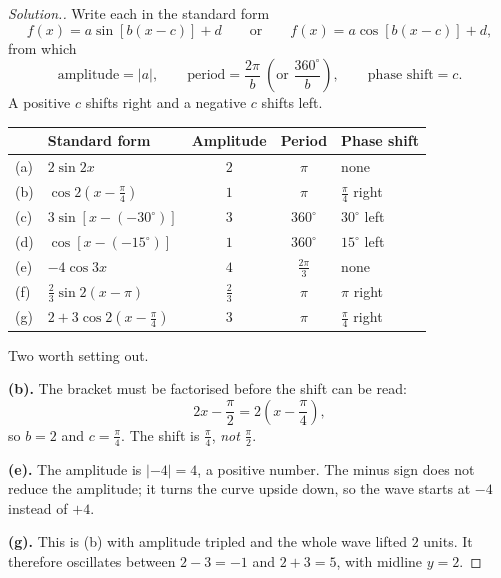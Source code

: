 \documentclass[11pt,a4paper]{article}
\theoremstyle{definition}
\newenvironment{solution}
  {\renewcommand{\qedsymbol}{}\begin{proof}[\textit{Solution}.]}
  {\end{proof}}
\begin{document}
\begin{solution}
Write each in the standard form
$$f(x)=a\sin\left[b(x-c)\right]+d\qquad\text{or}\qquad f(x)=a\cos\left[b(x-c)\right]+d,$$
from which
$$\text{amplitude}=|a|,\qquad \text{period}=\frac{2\pi}{b}
\ \left(\text{or } \frac{360^\circ}{b}\right),\qquad \text{phase shift}=c.$$
A positive $c$ shifts right and a negative $c$ shifts left.

\begin{table}[H]
\centering
\begin{tabular}{|l|l|c|c|l|}
\hline
 & Standard form & Amplitude & Period & Phase shift\\
\hline
(a) & $2\sin 2x$ & $2$ & $\pi$ & none\\
(b) & $\cos 2\left(x-\frac{\pi}{4}\right)$ & $1$ & $\pi$ & $\frac{\pi}{4}$ right\\
(c) & $3\sin\left[x-(-30^\circ)\right]$ & $3$ & $360^\circ$ & $30^\circ$ left\\
(d) & $\cos\left[x-(-15^\circ)\right]$ & $1$ & $360^\circ$ & $15^\circ$ left\\
(e) & $-4\cos 3x$ & $4$ & $\frac{2\pi}{3}$ & none\\
(f) & $\frac{2}{3}\sin 2(x-\pi)$ & $\frac{2}{3}$ & $\pi$ & $\pi$ right\\
(g) & $2+3\cos 2\left(x-\frac{\pi}{4}\right)$ & $3$ & $\pi$ & $\frac{\pi}{4}$ right\\
\hline
\end{tabular}
\end{table}

Two worth setting out.

\textbf{(b).} The bracket must be factorised before the shift can be read:
$$2x-\frac{\pi}{2}=2\left(x-\frac{\pi}{4}\right),$$
so $b=2$ and $c=\frac{\pi}{4}$. The shift is $\frac{\pi}{4}$, \emph{not} $\frac{\pi}{2}$.

\textbf{(e).} The amplitude is $|-4|=4$, a positive number. The minus sign does not
reduce the amplitude; it turns the curve upside down, so the wave starts at $-4$ instead
of $+4$.

\textbf{(g).} This is (b) with amplitude tripled and the whole wave lifted $2$ units. It
therefore oscillates between $2-3=-1$ and $2+3=5$, with midline $y=2$.


\end{solution}
\end{document}
